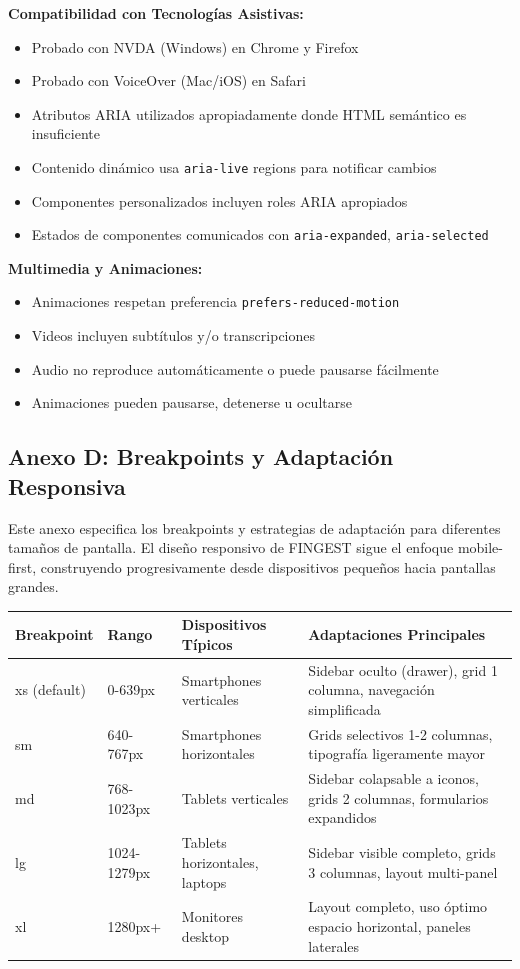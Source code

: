 \documentclass[12pt,a4paper,oneside]{article}
\begin{document}
\textbf{Compatibilidad con Tecnologías Asistivas:}
\begin{itemize}
    \item[$\square$] Probado con NVDA (Windows) en Chrome y Firefox
    \item[$\square$] Probado con VoiceOver (Mac/iOS) en Safari
    \item[$\square$] Atributos ARIA utilizados apropiadamente donde HTML semántico es insuficiente
    \item[$\square$] Contenido dinámico usa \texttt{aria-live} regions para notificar cambios
    \item[$\square$] Componentes personalizados incluyen roles ARIA apropiados
    \item[$\square$] Estados de componentes comunicados con \texttt{aria-expanded}, \texttt{aria-selected}
\end{itemize}

\textbf{Multimedia y Animaciones:}
\begin{itemize}
    \item[$\square$] Animaciones respetan preferencia \texttt{prefers-reduced-motion}
    \item[$\square$] Videos incluyen subtítulos y/o transcripciones
    \item[$\square$] Audio no reproduce automáticamente o puede pausarse fácilmente
    \item[$\square$] Animaciones pueden pausarse, detenerse u ocultarse
\end{itemize}

\subsection{Anexo D: Breakpoints y Adaptación Responsiva}

Este anexo especifica los breakpoints y estrategias de adaptación para diferentes tamaños de pantalla. El diseño responsivo de FINGEST sigue el enfoque mobile-first, construyendo progresivamente desde dispositivos pequeños hacia pantallas grandes.

\begin{center}
\begin{tabular}{|l|l|p{3cm}|p{6cm}|}
\hline
\textbf{Breakpoint} & \textbf{Rango} & \textbf{Dispositivos Típicos} & \textbf{Adaptaciones Principales} \\
\hline
xs (default) & 0-639px & Smartphones verticales & Sidebar oculto (drawer), grid 1 columna, navegación simplificada \\
\hline
sm & 640-767px & Smartphones horizontales & Grids selectivos 1-2 columnas, tipografía ligeramente mayor \\
\hline
md & 768-1023px & Tablets verticales & Sidebar colapsable a iconos, grids 2 columnas, formularios expandidos \\
\hline
lg & 1024-1279px & Tablets horizontales, laptops & Sidebar visible completo, grids 3 columnas, layout multi-panel \\
\hline
xl & 1280px+ & Monitores desktop & Layout completo, uso óptimo espacio horizontal, paneles laterales \\
\hline
\end{tabular}
\end{center}
\end{document}
